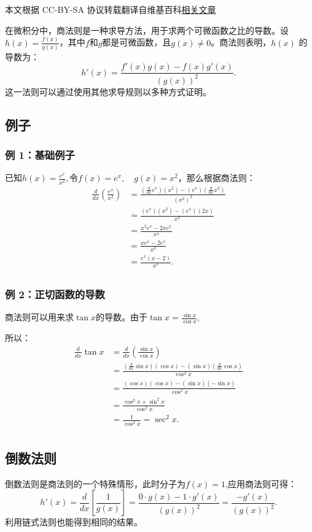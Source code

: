 
本文根据 CC-BY-SA 协议转载翻译自维基百科\href{https://en.wikipedia.org/wiki/Quotient_rule}{相关文章}

在微积分中，商法则是一种求导方法，用于求两个可微函数之比的导数。设$h(x) = \frac{f(x)}{g(x)}$，其中$f$和$g$都是可微函数，且$g(x) \neq 0$。商法则表明，$h(x)$ 的导数为：
$$
h'(x) = \frac{f'(x)g(x) - f(x)g'(x)}{(g(x))^2}.~
$$
这一法则可以通过使用其他求导规则以多种方式证明。
\subsection{例子}
\subsubsection{例 1：基础例子}
已知$h(x) = \frac{e^x}{x^2},$令$f(x) = e^x, \quad g(x) = x^2$，那么根据商法则：
$$
\begin{aligned}
\frac{d}{dx}\left(\frac{e^x}{x^2}\right) 
&= \frac{\left(\frac{d}{dx} e^x\right)(x^2) - (e^x)\left(\frac{d}{dx} x^2\right)}{(x^2)^2}\\
&= \frac{(e^x)(x^2) - (e^x)(2x)}{x^4}\\
&= \frac{x^2 e^x - 2x e^x}{x^4}\\
&= \frac{x e^x - 2 e^x}{x^3}\\
&= \frac{e^x (x-2)}{x^3}.\\
\end{aligned}~
$$
\subsubsection{例 2：正切函数的导数}
商法则可以用来求$\tan x$的导数。由于$\tan x = \frac{\sin x}{\cos x}$,

所以：
$$
\begin{aligned}
\frac{d}{dx}\tan x &= \frac{d}{dx}\left(\frac{\sin x}{\cos x}\right)\\
&= \frac{\left(\frac{d}{dx}\sin x\right)(\cos x) - (\sin x)\left(\frac{d}{dx}\cos x\right)}{\cos^2 x}\\
&= \frac{(\cos x)(\cos x) - (\sin x)(- \sin x)}{\cos^2 x}\\
&= \frac{\cos^2 x + \sin^2 x}{\cos^2 x}\\
&= \frac{1}{\cos^2 x} = \sec^2 x.\\
\end{aligned}~
$$
\subsection{倒数法则}
倒数法则是商法则的一个特殊情形，此时分子为$f(x) = 1$,应用商法则可得：
$$
h'(x) = \frac{d}{dx}\left[\frac{1}{g(x)}\right] 
= \frac{0 \cdot g(x) - 1 \cdot g'(x)}{(g(x))^2} 
= \frac{-g'(x)}{(g(x))^2}.~
$$
利用链式法则也能得到相同的结果。

